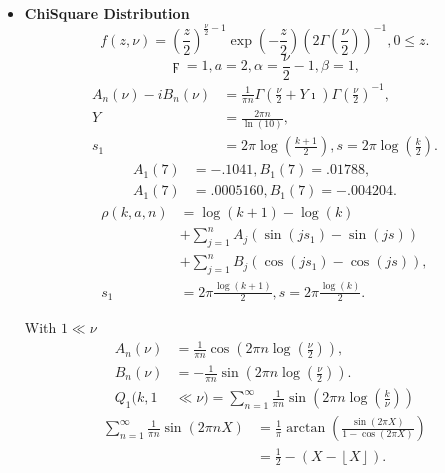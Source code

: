 \documentclass[titlepage,fleqn]{article}%
\begin{document}
\begin{itemize}
\item \textbf{ChiSquare Distribution}%
\[
f(z,\nu)=\left(  \frac{z}{2}\right)  ^{\frac{\nu}{2}-1}\exp\left(  -\frac
{z}{2}\right)  \left(  2\Gamma\left(  \frac{\nu}{2}\right)  \right)
^{-1},0\leq z.
\]%
\[
\digamma=1,a=2,\alpha=\frac{\nu}{2}-1,\beta=1,
\]%
\begin{align}
A_{n}(\nu)-iB_{n}(\nu)  &  =\frac{1}{\pi n}\Gamma\left(  \frac{\nu}{2}%
+Y\imath\right)  \Gamma\left(  \frac{\nu}{2}\right)  ^{-1},\\
Y  &  =\frac{2\pi n}{\ln(10)},\\
s_{1}  &  =2\pi\log\left(  \frac{k+1}{2}\right)  ,s=2\pi\log\left(  \frac
{k}{2}\right)  .
\end{align}%
\begin{align*}
A_{1}(7)  &  =-.1041,B_{1}(7)=.01788,\\
A_{1}(7)  &  =.0005160,B_{1}(7)=-.004204.
\end{align*}%
\begin{align*}
\rho(k,a,n)  &  =\log(k+1)-\log(k)\\
&  +%
{\displaystyle\sum\limits_{j=1}^{n}}
A_{j}(\sin(js_{1})-\sin(js))\\
&  +%
{\displaystyle\sum\limits_{j=1}^{n}}
B_{j}(\cos(js_{1})-\cos(js)),\\
s_{1}  &  =2\pi\frac{\log(k+1)}{2},s=2\pi\frac{\log(k)}{2}.
\end{align*}


With $1\ll\nu$
\begin{align*}
A_{n}(\nu)  &  =\frac{1}{\pi n}\cos\left(  2\pi n\log\left(  \frac{\nu}%
{2}\right)  \right)  ,\\
B_{n}(\nu)  &  =-\frac{1}{\pi n}\sin\left(  2\pi n\log\left(  \frac{\nu}%
{2}\right)  \right)  .\\
Q_{1}(k,1  &  \ll\nu)=%
{\displaystyle\sum\limits_{n=1}^{\infty}}
\frac{1}{\pi n}\sin\left(  2\pi n\log\left(  \frac{k}{\nu}\right)  \right)
\end{align*}%
\begin{align*}%
{\displaystyle\sum\limits_{n=1}^{\infty}}
\frac{1}{\pi n}\sin\left(  2\pi nX\right)   &  =\frac{1}{\pi}\arctan\left(
\frac{\sin(2\pi X)}{1-\cos(2\pi X)}\right) \\
&  =\frac{1}{2}-(X-\left\lfloor X\right\rfloor ).
\end{align*}



\end{itemize}
\end{document}
